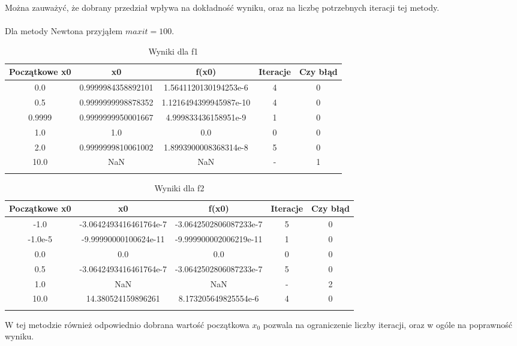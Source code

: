 \documentclass[15pt, a4paper]{article}
\begin{document}
\noindent Można zauważyć, że dobrany przedział wpływa na dokładność wyniku, oraz na liczbę potrzebnych iteracji tej metody.\\\\

\noindent Dla metody Newtona przyjąłem \(maxit = 100 \).

\begin{longtable}{|c|c|c|c|c|}
    \hline
    \textbf{Początkowe x0} & \textbf{x0} & \textbf{f(x0)} & \textbf{Iteracje} & \textbf{Czy błąd} \\
    \hline
    0.0 & 0.9999984358892101 & 1.5641120130194253e-6 & 4 & 0 \\
    \hline
    0.5 & 0.9999999998878352 & 1.1216494399945987e-10 & 4 & 0 \\
    \hline
    0.9999 & 0.9999999950001667 & 4.999833436158951e-9 & 1 & 0 \\
    \hline
    1.0 & 1.0 & 0.0 & 0 & 0 \\
    \hline
    2.0 & 0.9999999810061002 & 1.8993900008368314e-8 & 5 & 0 \\
    \hline
    10.0 & NaN & NaN & - & 1 \\
    \hline
    \caption{Wyniki dla f1}
\end{longtable}

\begin{longtable}{|c|c|c|c|c|}
    \hline
    \textbf{Początkowe x0} & \textbf{x0} & \textbf{f(x0)} & \textbf{Iteracje} & \textbf{Czy błąd} \\
    \hline
    -1.0 & -3.0642493416461764e-7 & -3.0642502806087233e-7 & 5 & 0 \\
    \hline
    -1.0e-5 & -9.99990000100624e-11 & -9.999900002006219e-11 & 1 & 0 \\
    \hline
    0.0 & 0.0 & 0.0 & 0 & 0 \\
    \hline
    0.5 & -3.0642493416461764e-7 & -3.0642502806087233e-7 & 5 & 0 \\
    \hline
    1.0 & NaN & NaN & - & 2 \\
    \hline
    10.0 & 14.380524159896261 & 8.173205649825554e-6 & 4 & 0 \\
    \hline
    \caption{Wyniki dla f2}
\end{longtable}

\noindent W tej metodzie również odpowiednio dobrana wartość początkowa \( x_0 \) pozwala na ograniczenie liczby iteracji, oraz w ogóle na poprawność wyniku. 

\end{document}
